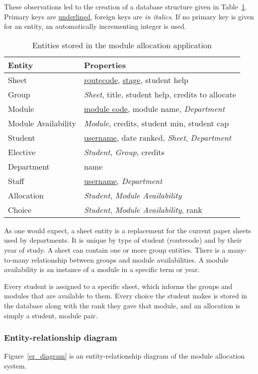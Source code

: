 These observations led to the creation of a database structure given in
Table~\ref{development_database_schema}. Primary keys are
\underline{underlined}, foreign keys are \emph{in italics}. If no primary key
is given for an entity, an automatically incrementing integer is used.

\begin{table}
  \begin{center}
    \begin{tabular}{ | l | l | }
      \hline
      \textbf{Entity} & \textbf{Properties} \\
      \hline
      Sheet & \underline{\gls{routecode}}, \underline{\gls{stage}}, student help \\
      Group & \emph{Sheet}, title, student help, credits to allocate \\
      Module & \underline{module code}, module name, \emph{Department} \\
      Module Availability & \emph{Module}, credits, student min, student cap \\
      Student & \underline{username}, date ranked, \emph{Sheet}, \emph{Department} \\
      Elective & \emph{Student}, \emph{Group}, credits \\
      Department & name \\
      Staff & \underline{username}, \emph{Department} \\
      Allocation & \emph{Student}, \emph{Module Availability} \\
      Choice & \emph{Student}, \emph{Module Availability}, rank \\
      \hline
    \end{tabular}
  \end{center}
  \caption{Entities stored in the module allocation application}
  \label{development_database_schema}
\end{table}

As one would expect, a sheet entity is a replacement for the current paper
sheets used by departments. It is unique by type of student (\gls{routecode})
and by their year of study. A sheet can contain one or more group entities.
There is a many-to-many relationship between groups and module availabilities.
A module availability is an instance of a module in a specific term or year.

Every student is assigned to a specific sheet, which informs the groups and
modules that are available to them. Every choice the student makes is stored
in the database along with the rank they gave that module, and an allocation
is simply a student, module pair.


\subsubsection{Entity-relationship diagram}

Figure~\ref{er_diagram} is an entity-relationship diagram of the module
allocation system.


